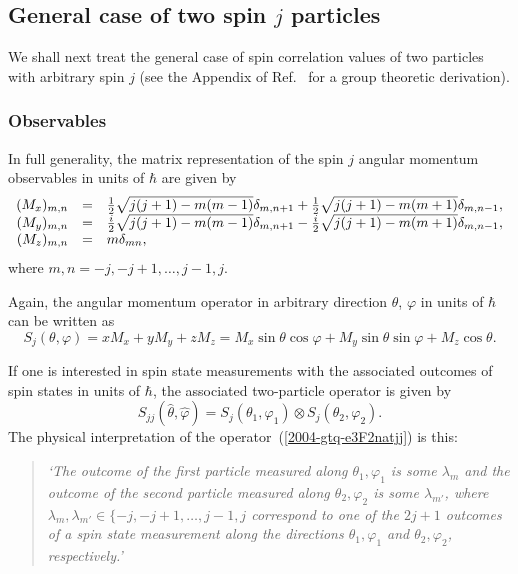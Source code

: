 \documentclass[fleqn,twoside]{article}      %
\begin{document}

\subsection{General case of two spin $j$ particles}

We shall next treat the general case of spin correlation values of two particles with arbitrary spin $j$
(see the Appendix of Ref.~\cite{svozil-krenn} for a group theoretic derivation).

\subsubsection*{Observables}

In full generality, the matrix representation of the spin $j$ angular momentum observables in units of $\hbar$ are given by
\begin{equation}
\begin{array}{rcl}
(M_x)_{m,n}&=&
{1\over 2}\sqrt{j(j+1)-m(m-1)}\delta_{m,n+1} + {1\over 2}\sqrt{j(j+1)-m(m+1)}\delta_{m,n-1},\\
(M_y)_{m,n}&=&
{i\over 2}\sqrt{j(j+1)-m(m-1)}\delta_{m,n+1} -{i\over 2}\sqrt{j(j+1)-m(m+1)}\delta_{m,n-1},\\
(M_z)_{m,n}&=&m\delta_{mn},
\end{array}
\end{equation}
where $m,n=-j,-j+1,\ldots ,j-1,j$.

Again, the angular momentum operator in arbitrary direction $\theta$, $\varphi$ in units of $\hbar$ can be written as
\begin{equation}
S_j (\theta ,\varphi) =
xM_x
+
yM_y
+
zM_z
=
 M_x  \sin \theta \cos \varphi
+
M_y   \sin \theta \sin \varphi
+
M_z   \cos \theta
.
\label{e-2009-gtq-sjj}
\end{equation}


If one is interested in spin state measurements with the associated outcomes of spin states in units of $\hbar$,
the associated two-particle operator is given by
\begin{equation}
 S_{j j } ({\hat \theta},{\hat \varphi} ) =
S_{j }( \theta_1,\varphi_1 )
\otimes
S_{j }( \theta_2,\varphi_2 ).
\label{2004-gtq-e3F2natjj}
\end{equation}
The physical interpretation of the operator~(\ref{2004-gtq-e3F2natjj}) is this:
\begin{quote}
{\em `The outcome of the first particle measured along $\theta_1,\varphi_1$ is some $\lambda_{m}$
      and
      the outcome of the second particle measured along $\theta_2,\varphi_2$ is some $\lambda_{m'}$,
      where  $\lambda_{m}, \lambda_{m'}\in \{-j,-j+1,\ldots ,j-1,j$ correspond to one of the $2j+1$ outcomes of a spin state measurement
      along the directions $\theta_1,\varphi_1$ and $\theta_2,\varphi_2$, respectively.'
}
\end{quote}
\end{document}
